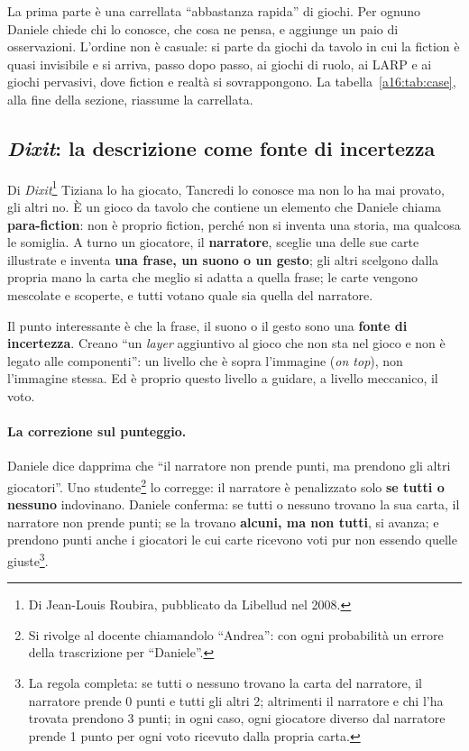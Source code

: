La prima parte è una carrellata ``abbastanza rapida'' di giochi. Per ognuno Daniele chiede chi
lo conosce, che cosa ne pensa, e aggiunge un paio di osservazioni. L'ordine non è casuale: si
parte da giochi da tavolo in cui la fiction è quasi invisibile e si arriva, passo dopo passo,
ai giochi di ruolo, ai LARP e ai giochi pervasivi, dove fiction e realtà si sovrappongono. La
tabella~\ref{a16:tab:case}, alla fine della sezione, riassume la carrellata.

\subsection{\emph{Dixit}: la descrizione come fonte di incertezza}



Di \emph{Dixit}\footnote{Di Jean-Louis Roubira, pubblicato da Libellud nel 2008.} Tiziana lo
ha giocato, Tancredi lo conosce ma non lo ha mai provato, gli altri no. È un gioco da tavolo
che contiene un elemento che Daniele chiama \textbf{para-fiction}: non è proprio fiction,
perché non si inventa una storia, ma qualcosa le somiglia. A turno un giocatore, il
\textbf{narratore}, sceglie una delle sue carte illustrate e inventa \textbf{una frase, un
suono o un gesto}; gli altri scelgono dalla propria mano la carta che meglio si adatta a quella
frase; le carte vengono mescolate e scoperte, e tutti votano quale sia quella del narratore.

Il punto interessante è che la frase, il suono o il gesto sono una \textbf{fonte di
incertezza}. Creano ``un \emph{layer} aggiuntivo al gioco che non sta nel gioco e non è legato
alle componenti'': un livello che è sopra l'immagine (\emph{on top}), non l'immagine stessa.
Ed è proprio questo livello a guidare, a livello meccanico, il voto.

\paragraph{La correzione sul punteggio.} Daniele dice dapprima che ``il narratore non prende
punti, ma prendono gli altri giocatori''. Uno studente\footnote{Si rivolge al docente
chiamandolo ``Andrea'': con ogni probabilità un errore della trascrizione per ``Daniele''.} lo
corregge: il narratore è penalizzato solo \textbf{se tutti o nessuno} indovinano. Daniele
conferma: se tutti o nessuno trovano la sua carta, il narratore non prende punti; se la trovano
\textbf{alcuni, ma non tutti}, si avanza; e prendono punti anche i giocatori le cui carte
ricevono voti pur non essendo quelle giuste\footnote{La regola completa: se tutti o nessuno
trovano la carta del narratore, il narratore prende 0 punti e tutti gli altri 2; altrimenti il
narratore e chi l'ha trovata prendono 3 punti; in ogni caso, ogni giocatore diverso dal
narratore prende 1 punto per ogni voto ricevuto dalla propria carta.}.

